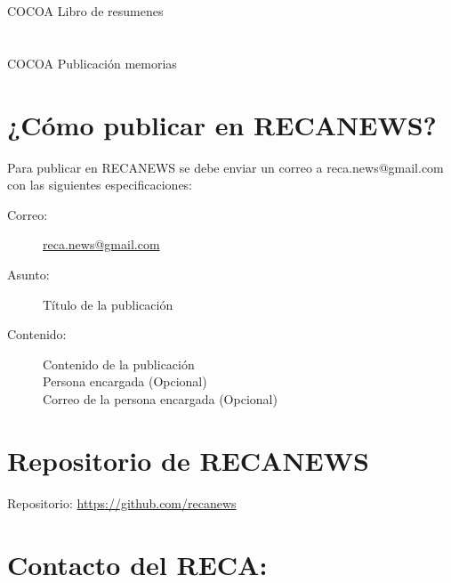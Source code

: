 \documentclass{book}
\begin{document}
\section*{}

COCOA Libro de resumenes

\section*{}

COCOA Publicación memorias

\section*{¿Cómo publicar en RECANEWS?}

Para publicar en RECANEWS se debe enviar un correo a reca.news@gmail.com con las siguientes especificaciones:
\begin{description}
\item[Correo:]\url{reca.news@gmail.com}
\item[Asunto:]Título de la publicación
\item[Contenido:]Contenido de la publicación\\
Persona encargada (Opcional)\\
Correo de la persona encargada (Opcional)
\end{description}
  
\section*{Repositorio de RECANEWS}

Repositorio: \url{https://github.com/recanews}\\



\section*{Contacto del RECA:}
\end{document}
